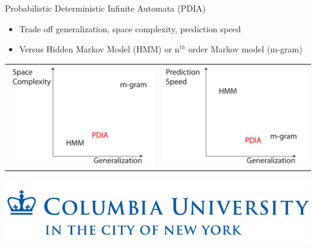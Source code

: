 \documentclass[16pt]{beamer}
\begin{document}
\begin{frame}
	\begin{block}{Probabilistic Deterministic Infinite Automata (PDIA)}
		\begin{itemize}
			\item{Trade off generalization, space complexity, prediction speed}
			\item{Versus Hidden Markov Model (HMM) or n$^{th}$ order Markov model (m-gram)}
		\end{itemize}
	\end{block}
 	\begin{center}
		\begin{table}[ht]
			\begin{tabular}{cc}
				\includegraphics[scale=0.1]{front.pdf} & 
				\includegraphics[scale=0.1]{side.pdf}
			\end{tabular}
		\end{table}
	\end{center}
	\vfill\vspace{1.13cm}\hfill\includegraphics[scale=0.2]{columbia_logo.pdf}
\end{frame}
\end{document}
